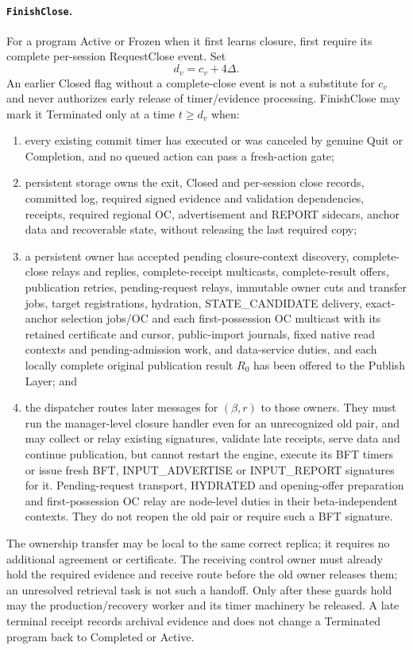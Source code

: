 \paragraph{\texttt{FinishClose}.}
For a program Active or Frozen when it first learns closure, first
require its complete per-session RequestClose event. Set
\[
 d_v=c_v+4\Delta.
\]
An earlier Closed flag without a complete-close event is not a substitute
for $c_v$ and never authorizes early release of timer/evidence processing.
FinishClose may mark it Terminated only at a time $t\ge d_v$ when:
\begin{enumerate}[label=(\roman*),itemsep=2pt]
\item every existing commit timer has executed or was canceled by
genuine Quit or Completion, and no queued action can pass a fresh-action
gate;
\item persistent storage owns the exit, Closed and per-session close records,
committed log, required signed evidence and validation dependencies,
receipts, required regional OC, advertisement and REPORT sidecars, anchor data and recoverable
state, without releasing the last
required copy;
\item a persistent owner has accepted pending closure-context discovery,
complete-close relays and replies, complete-receipt multicasts,
complete-result offers, publication retries, pending-request relays,
immutable owner cuts and transfer jobs, target registrations, hydration,
STATE\_CANDIDATE delivery, exact-anchor selection jobs/OC and each
first-possession OC multicast with its retained certificate and cursor,
public-import journals, fixed native read contexts and pending-admission
work, and data-service duties, and each locally complete original publication
result $R_0$ has been offered to the
Publish Layer; and
\item the dispatcher routes later messages for $(\beta,r)$ to those
owners. They must run the manager-level closure handler even for an
unrecognized old pair, and may collect or relay existing signatures,
validate late receipts, serve data and continue publication, but cannot restart the
engine, execute its BFT timers or issue fresh BFT, INPUT\_ADVERTISE or INPUT\_REPORT
signatures for it. Pending-request transport, HYDRATED and opening-offer
preparation and first-possession OC relay are node-level duties in their beta-independent contexts.
They do not reopen the old pair or require such a BFT signature.
\end{enumerate}
The ownership transfer may be local to the same correct replica; it
requires no additional agreement or certificate. The receiving control
owner must already hold the required evidence and receive route before
the old owner releases them; an unresolved retrieval task is not such
a handoff. Only after these
guards hold may the production/recovery worker and its timer machinery
be released. A late terminal receipt records archival evidence and does
not change a Terminated program back to Completed or Active.

